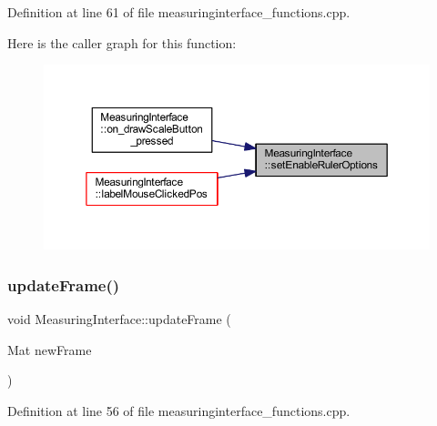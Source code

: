 Definition at line 61 of file measuringinterface\+\_\+functions.\+cpp.

Here is the caller graph for this function\+:
\nopagebreak
\begin{figure}[H]
\begin{center}
\leavevmode
\includegraphics[width=350pt]{classMeasuringInterface_acf541a942e47266c30a8d473de4aca98_icgraph}
\end{center}
\end{figure}
\mbox{\label{classMeasuringInterface_ac117ad50a7b325e4aff2651a6a04d1f4}} 
\subsubsection{\texorpdfstring{updateFrame()}{updateFrame()}}
{\footnotesize\ttfamily void Measuring\+Interface\+::update\+Frame (\begin{DoxyParamCaption}\item[{Mat}]{new\+Frame }\end{DoxyParamCaption})\hspace{0.3cm}{\ttfamily [private]}}



Definition at line 56 of file measuringinterface\+\_\+functions.\+cpp.

